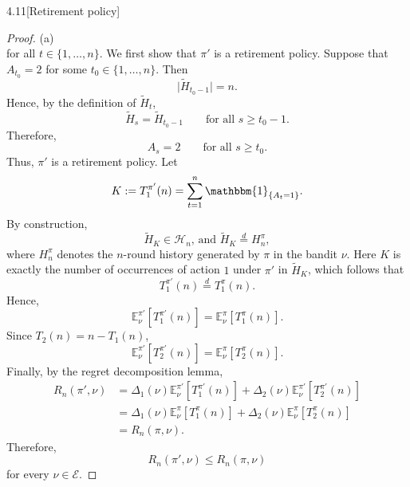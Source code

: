 \documentclass[10pt]{article}
\theoremstyle{definition}
\newenvironment{exercise*}[1]{%
  \IfBlankTF{#1}
    {\renewcommand{\themanualexerciseinner}{\unskip}}
    {\renewcommand\themanualexerciseinner{#1}}%
  \manualexerciseinner
}{\endmanualexerciseinner}
\begin{document}
\begin{exercise*}{4.11}[Retirement policy]
\begin{proof}{(a)}
\begin{equation*}
        \end{equation*}
        for all $t\in\{1,\ldots,n\}$.
        We first show that $\pi'$ is a retirement policy. 
        Suppose that $A_{t_0}=2$ for some $t_0\in\{1,\ldots,n\}$. 
        Then 
        \begin{equation*}
            \lvert\widetilde H_{t_0-1}\rvert=n. 
        \end{equation*}
        Hence, by the definition of $\widetilde H_t$, 
        \begin{equation*}
            \widetilde H_s=\widetilde H_{t_0-1} \qquad\text{for all }s\geq t_0-1. 
        \end{equation*}
        Therefore, 
        \begin{equation*}
            A_s=2 \qquad\text{for all }s\geq t_0. 
        \end{equation*}
        Thus, $\pi'$ is a retirement policy. 
        Let 
        \begin{equation*}
            K:=T_1^{\pi'}(n) = \sum_{t=1}^n \mathbbm{1}_{\{A_t=1\}}. 
        \end{equation*}
        By construction, 
        \begin{equation*}
            \widetilde H_K\in\mathcal H_n \text{, and } \widetilde H_K \overset{d}{=} H_n^\pi, 
        \end{equation*}
        where $H_n^\pi$ denotes the $n$-round history generated by $\pi$ in the bandit $\nu$. 
        Here $K$ is exactly the number of occurrences of action $1$ under $\pi '$ in $\widetilde H_K$, which follows that 
        \begin{equation*}
            T_1^{\pi'}(n) \overset{d}{=} T_1^\pi(n). 
        \end{equation*}
        Hence, 
        \begin{equation*}
            \mathbb E_\nu^{\pi'}[T_1^{\pi'}(n)] = \mathbb E_\nu^\pi[T_1^\pi(n)]. 
        \end{equation*}
        Since $T_2(n)=n-T_1(n)$, 
        \begin{equation*}
            \mathbb E_\nu^{\pi'}[T_2^{\pi'}(n)] = \mathbb E_\nu^\pi[T_2^\pi(n)]. 
        \end{equation*}
        Finally, by the regret decomposition lemma, 
        \begin{align*} 
            R_n(\pi',\nu) &= \Delta_1(\nu)\mathbb E_\nu^{\pi'}[T_1^{\pi'}(n)] + \Delta_2(\nu)\mathbb E_\nu^{\pi'}[T_2^{\pi'}(n)]\\ 
            &= \Delta_1(\nu)\mathbb E_\nu^\pi[T_1^\pi(n)] + \Delta_2(\nu)\mathbb E_\nu^\pi[T_2^\pi(n)]\\
            &= R_n(\pi,\nu). 
        \end{align*} 
        Therefore, 
        \begin{equation*}
        R_n(\pi',\nu)\leq R_n(\pi,\nu) 
        \end{equation*}
        for every $\nu\in\mathcal E$. 


\end{proof}
\end{exercise*}
\end{document}
